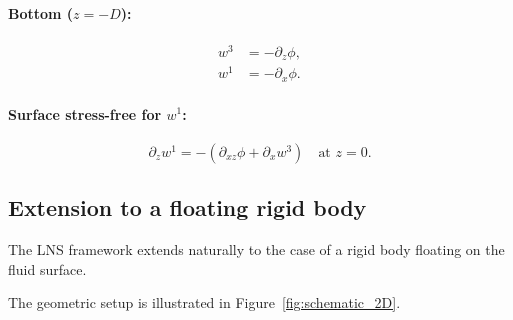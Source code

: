 \documentclass{article}
\begin{document}
\paragraph{Bottom ($z = -D$):}
\begin{align}
    w^3 &= -\partial_z\phi, \label{eq:nd_bot_w3} \\
    w^1 &= -\partial_x\phi. \label{eq:nd_bot_w1}
\end{align}

\paragraph{Surface stress-free for $w^1$:}
\begin{equation}
    \partial_z w^1 = -(\partial_{xz}\phi + \partial_x w^3) \quad \text{at } z = 0. \label{eq:nd_surf_w1}
\end{equation}

\subsection{Extension to a floating rigid body}
\label{sec:floating_body}

The LNS framework extends naturally to the case of a rigid body floating on the fluid surface.

The geometric setup is illustrated in Figure~\ref{fig:schematic_2D}.
\end{document}
